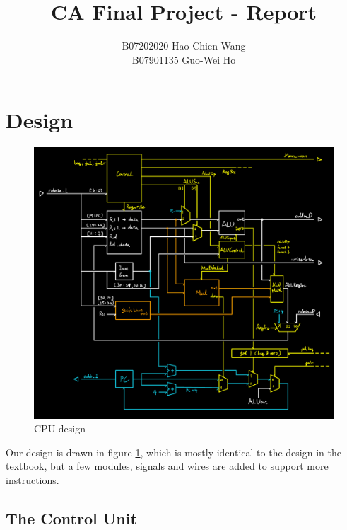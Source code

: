 \documentclass[12pt]{article}
\title{CA Final Project - Report}
\author{B07202020 Hao-Chien Wang\\B07901135 Guo-Wei Ho}
\begin{document}
\maketitle

\section{Design}%
\label{sec:design}

\begin{figure}[h!]
	\centering
	\includegraphics[width=\linewidth]{./CA-Final-Project-Design-crop.pdf}
	\caption{CPU design}%
	\label{fig:design}
\end{figure}


Our design is drawn in figure \ref{fig:design}, which is mostly identical to the
design in the textbook, but a few modules, signals and wires are added to support
more instructions. \\

\subsection{The Control Unit}%
\label{sub:the_control_unit}
\end{document}
